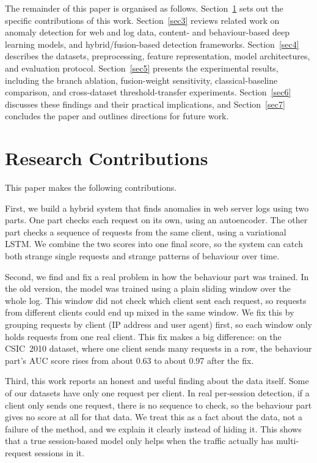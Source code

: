 \documentclass[futureinternet,article,accept,moreauthors]{Definitions/mdpi}
\begin{document}
The remainder of this paper is organised as follows. Section~\ref{sec2} sets out the specific contributions of this work. Section~\ref{sec3} reviews related work on anomaly detection for web and log data, content- and behaviour-based deep learning models, and hybrid/fusion-based detection frameworks. Section~\ref{sec4} describes the datasets, preprocessing, feature representation, model architectures, and evaluation protocol. Section~\ref{sec5} presents the experimental results, including the branch ablation, fusion-weight sensitivity, classical-baseline comparison, and cross-dataset threshold-transfer experiments. Section~\ref{sec6} discusses these findings and their practical implications, and Section~\ref{sec7} concludes the paper and outlines directions for future work.

\section{Research Contributions} \label{sec2}

This paper makes the following contributions.

First, we build a hybrid system that finds anomalies in web server logs using two parts. One part checks each request on its own, using an autoencoder. The other part checks a sequence of requests from the same client, using a variational LSTM. We combine the two scores into one final score, so the system can catch both strange single requests and strange patterns of behaviour over time.

Second, we find and fix a real problem in how the behaviour part was trained. In the old version, the model was trained using a plain sliding window over the whole log. This window did not check which client sent each request, so requests from different clients could end up mixed in the same window. We fix this by grouping requests by client (IP address and user agent) first, so each window only holds requests from one real client. This fix makes a big difference: on the CSIC~2010 dataset, where one client sends many requests in a row, the behaviour part's AUC score rises from about 0.63 to about 0.97 after the fix.

Third, this work reports an honest and useful finding about the data itself. Some of our datasets have only one request per client. In real per-session detection, if a client only sends one request, there is no sequence to check, so the behaviour part gives no score at all for that data. We treat this as a fact about the data, not a failure of the method, and we explain it clearly instead of hiding it. This shows that a true session-based model only helps when the traffic actually has multi-request sessions in it.
\end{document}
